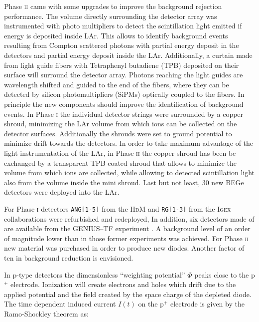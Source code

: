 Phase \textsc{ii} came with some upgrades to improve the background rejection performance. The volume directly surrounding the detector array was instrumented with photo multipliers to detect the scintillation light emitted if energy is deposited inside LAr. This allows to identify background events resulting from Compton scattered photons with partial energy deposit in the detectors and partial energy deposit inside the LAr. Additionally, a curtain made from light guide fibers with Tetraphenyl butadiene (TPB) deposited on their surface will surround the detector array. Photons reaching the light guides are wavelength shifted and guided to the end of the fibers, where they can be detected by silicon photomultipliers (SiPMs) optically coupled to the fibers. In principle the new components should improve the identification of background events. In Phase \textsc{i} the individual detector strings were surrounded by a copper shroud, minimizing the LAr volume from which  ions can be collected on the detector surfaces. Additionally the shrouds were set to ground potential to minimize drift towards the detectors. In order to take maximum advantage of the light instrumentation of the LAr, in Phase \textsc{ii} the copper shroud has been be exchanged by a transparent TPB-coated shroud that allows to minimize the volume from which  ions are collected, while allowing to detected scintillation light also from the volume inside the mini shroud. Last but not least, 30 new BEGe detectors were deployed into the LAr.

 For Phase \textsc{i} detectors \texttt{ANG[1-5]} from the \textsc{HdM} \cite{hdm} and \texttt{RG[1-3]} from the \textsc{Igex} \cite{igex} collaborations were refurbished and redeployed, In addition, six detectors made of  are available from the GENIUS--TF experiment \cite{genius1, genius2}. A background level of an order of magnitude lower than in those former experiments was achieved. For Phase \textsc{ii} new material was purchased in order to produce new diodes. Another factor of ten in background reduction is envisioned.

In p-type detectors the dimensionless ``weighting potential'' $\Phi$ peaks close to the p$^+$ electrode. Ionization will create electrons and holes which drift due to the applied potential and the field created by the space charge of the depleted diode. The time dependent induced current $I(t)$ on the p$^+$ electrode is given by the Ramo-Shockley theorem \cite{} as:

